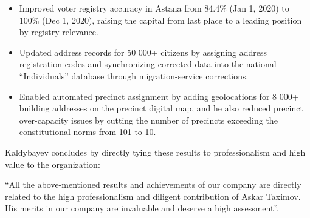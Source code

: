 \begin{itemize}[nosep]
\item Improved voter registry accuracy in Astana from 84.4\% (Jan 1, 2020) to 100\% (Dec 1, 2020), raising the capital from last place to a leading position by registry relevance.
\item Updated address records for 50 000+ citizens by assigning address registration codes and synchronizing corrected data into the national “Individuals” database through migration-service corrections.
\item Enabled automated precinct assignment by adding geolocations for 8 000+ building addresses on the precinct digital map, and he also reduced precinct over-capacity issues by cutting the number of precincts exceeding the constitutional norms from 101 to 10.
\end{itemize}

Kaldybayev concludes by directly tying these results to \mrls professionalism and high value to the organization:
\begin{fullquote}
``All the above-mentioned results and achievements of our company are directly related to the high professionalism and diligent contribution of Askar Taximov. His merits in our company are invaluable and deserve a high assessment''.
\end{fullquote}
